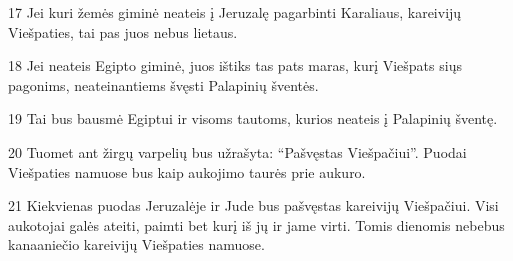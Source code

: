 \par 17 Jei kuri žemės giminė neateis į Jeruzalę pagarbinti Karaliaus, kareivijų Viešpaties, tai pas juos nebus lietaus. 
\par 18 Jei neateis Egipto giminė, juos ištiks tas pats maras, kurį Viešpats siųs pagonims, neateinantiems švęsti Palapinių šventės. 
\par 19 Tai bus bausmė Egiptui ir visoms tautoms, kurios neateis į Palapinių šventę. 
\par 20 Tuomet ant žirgų varpelių bus užrašyta: “Pašvęstas Viešpačiui”. Puodai Viešpaties namuose bus kaip aukojimo taurės prie aukuro. 
\par 21 Kiekvienas puodas Jeruzalėje ir Jude bus pašvęstas kareivijų Viešpačiui. Visi aukotojai galės ateiti, paimti bet kurį iš jų ir jame virti. Tomis dienomis nebebus kanaaniečio kareivijų Viešpaties namuose.




